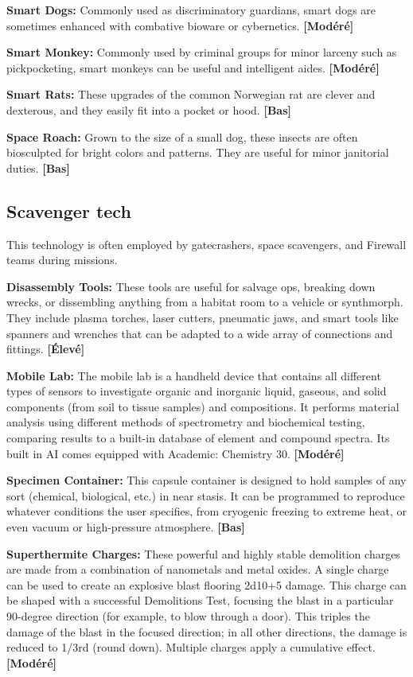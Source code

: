 {{\textbf{Smart Dogs:} Commonly used as discriminatory guardians, smart dogs are sometimes enhanced with combative bioware or cybernetics. \textbf{[Modéré]} 

\textbf{Smart Monkey:} Commonly used by criminal groups for minor larceny such as pickpocketing, smart monkeys can be useful and intelligent aides. \textbf{[Modéré]} 

\textbf{Smart Rats:} These upgrades of the common Norwegian rat are clever and dexterous, and they easily fit into a pocket or hood. \textbf{[Bas]} 

\textbf{Space Roach:} Grown to the size of a small dog, these insects are often biosculpted for bright colors and patterns. They are useful for minor janitorial duties. \textbf{[Bas]} 

\subsection{Scavenger tech} \label{sec:scavenger-tech} 

This technology is often employed by gatecrashers, space scavengers, and Firewall teams during missions. 

\textbf{Disassembly Tools:} These tools are useful for salvage ops, breaking down wrecks, or dissembling anything from a habitat room to a vehicle or synthmorph. They include plasma torches, laser cutters, pneumatic jaws, and smart tools like spanners and wrenches that can be adapted to a wide array of connections and fittings. \textbf{[Élevé]} 

\textbf{Mobile Lab:} The mobile lab is a handheld device that contains all different types of sensors to investigate organic and inorganic liquid, gaseous, and solid components (from soil to tissue samples) and compositions. It performs material analysis using different methods of spectrometry and biochemical testing, comparing results to a built-in database of element and compound spectra. Its built in AI comes equipped with Academic: Chemistry 30. \textbf{[Modéré]} 

\textbf{Specimen Container:} This capsule container is designed to hold samples of any sort (chemical, biological, etc.) in near stasis. It can be programmed to reproduce whatever conditions the user specifies, from cryogenic freezing to extreme heat, or even vacuum or high-pressure atmosphere. \textbf{[Bas]} 

\textbf{Superthermite Charges:} These powerful and highly stable demolition charges are made from a combination of nanometals and metal oxides. A single charge can be used to create an explosive blast flooring 2d10+5 damage. This charge can be shaped with a successful Demolitions Test, focusing the blast in a particular 90-degree direction (for example, to blow through a door). This triples the damage of the blast in the focused direction; in all other directions, the damage is reduced to 1/3rd (round down). Multiple charges apply a cumulative effect. \textbf{[Modéré]} 

}}
